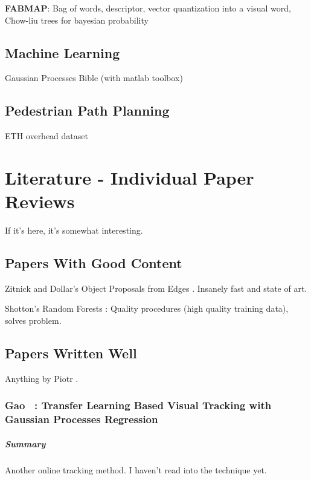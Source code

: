 \textbf{FABMAP}:
Bag of words,  descriptor, vector quantization into a visual word, Chow-liu trees for bayesian probability

\section{Machine Learning}
Gaussian Processes Bible (with matlab toolbox) \cite{rasmussen2006gaussian}


\section{Pedestrian Path Planning}
ETH overhead dataset \cite{pellegrini2009you}

\chapter{Literature - Individual Paper Reviews}

If it's here, it's somewhat interesting.
\section{Papers With Good Content}
Zitnick and Dollar's Object Proposals from Edges \cite{zitnick2014edge}. Insanely fast and state of art.

Shotton's Random Forests \cite{shotton2013real}: Quality procedures (high quality training data), solves problem.



\section{Papers Written Well}
Anything by Piotr \cite{dollar2014fast}.

\subsection{Gao \etal~\cite{gao2014transfer}: Transfer Learning Based Visual Tracking
with Gaussian Processes Regression}
\paragraph{Summary} Another online tracking method. I haven't read into the technique yet.
